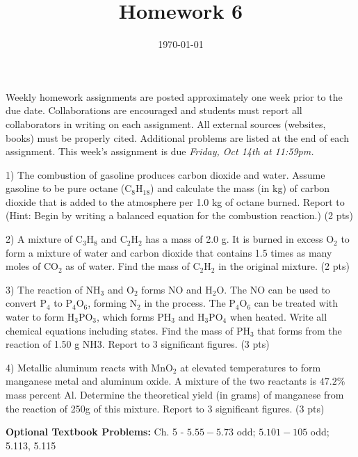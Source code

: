 \documentclass[12pt]{article}
\title{\textbf{Homework 6}}
\date{\vspace{-2em}\today}
\begin{document}
\maketitle 

Weekly homework assignments are posted approximately one week prior to the
due date. Collaborations are encouraged and students must report all collaborators
in writing on each assignment. All external sources (websites, books) must be
properly cited. Additional problems are listed at the end of each assignment.
This week's assignment is due \textit{Friday, Oct 14th at 11:59pm.}

1) The combustion of gasoline produces carbon dioxide and water.
Assume gasoline to be pure octane (C$_8$H$_{18}$) and calculate the
mass (in kg) of carbon dioxide that is added to the atmosphere
per 1.0 kg of octane burned. Report to  (Hint: Begin by writing a balanced
equation for the combustion reaction.) (2 pts)

\vspace{2in}

2) A mixture of C$_3$H$_8$ and C$_2$H$_2$ has a mass of 2.0 g. It is burned in
excess O$_2$ to form a mixture of water and carbon dioxide that
contains 1.5 times as many moles of CO$_2$ as of water. Find the
mass of C$_2$H$_2$ in the original mixture. (2 pts)

\newpage

3) The reaction of NH$_3$ and O$_2$ forms NO and H$_2$O. The NO can be
used to convert P$_4$ to P$_4$O$_6$, forming N$_2$ in the process. The P$_4$O$_6$
can be treated with water to form H$_3$PO$_3$, which forms PH$_3$ and
H$_3$PO$_4$ when heated. Write all chemical equations including states.
Find the mass of PH$_3$ that forms from the reaction of 1.50 g NH3. Report
to 3 significant figures. (3 pts)

\vspace{2.5in}

4) Metallic aluminum reacts with MnO$_2$ at elevated temperatures to
form manganese metal and aluminum oxide. A mixture of the two
reactants is $47.2\%$ mass percent Al. Determine the theoretical yield
(in grams) of manganese from the reaction of 250g of this mixture. Report
to 3 significant figures. (3 pts)

\vfill

\textbf{Optional Textbook Problems:} Ch. 5 - $5.55 - 5.73$ odd; $5.101 - 105$ odd;
5.113, 5.115
\end{document}
